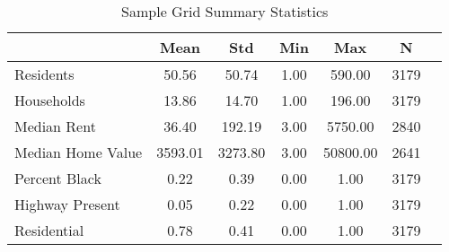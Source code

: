 \begin{table}[h]
\centering
\caption{Sample Grid Summary Statistics}
\label{tab:summary_stats}
\begin{tabular}{lcccccc}
\toprule
 & Mean & Std & Min & Max & N \\
\midrule
Residents & 50.56 & 50.74 & 1.00 & 590.00 & 3179 \\
Households & 13.86 & 14.70 & 1.00 & 196.00 & 3179 \\
Median Rent & 36.40 & 192.19 & 3.00 & 5750.00 & 2840 \\
Median Home Value & 3593.01 & 3273.80 & 3.00 & 50800.00 & 2641 \\
Percent Black & 0.22 & 0.39 & 0.00 & 1.00 & 3179 \\
Highway Present & 0.05 & 0.22 & 0.00 & 1.00 & 3179 \\
Residential & 0.78 & 0.41 & 0.00 & 1.00 & 3179 \\
\bottomrule
\end{tabular}
\end{table}
